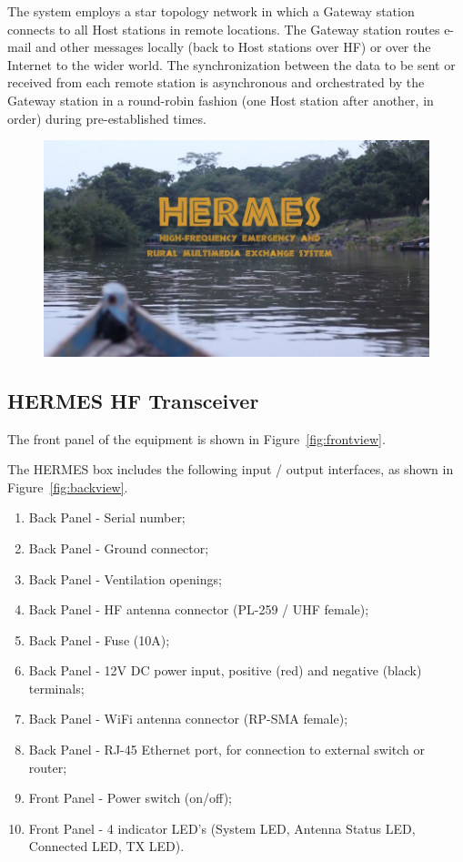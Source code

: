 \documentclass[11pt,a4paper]{article}
\begin{document}
The system employs a star topology network in which a Gateway station connects to all Host stations in remote locations. The Gateway station routes e-mail and other messages locally (back to Host stations over HF) or over the Internet to the wider world. The synchronization between the data to be sent or received from each remote station is asynchronous and orchestrated by the Gateway station in a round-robin fashion (one Host station after another, in order) during pre-established times.

\begin{figure}[!ht]
\includegraphics[width=1\textwidth]{pictures/hermes.png}
\end{figure}

\subsection{HERMES HF Transceiver}

The front panel of the equipment is shown in Figure~\ref{fig:frontview}.

The HERMES box includes the following input / output interfaces, as shown in Figure~\ref{fig:backview}.

\begin{enumerate}
    \item Back Panel - Serial number;
    \item Back Panel - Ground connector;
    \item Back Panel - Ventilation openings;
    \item Back Panel - HF antenna connector (PL-259 / UHF female);
     \item Back Panel - Fuse (10A);
    \item Back Panel - 12V DC power input, positive (red) and negative (black) terminals;
    \item Back Panel - WiFi antenna connector (RP-SMA female);
    \item Back Panel - RJ-45 Ethernet port, for connection to external switch or router;
    \item Front Panel - Power switch (on/off);
    \item Front Panel - 4 indicator LED's (System LED, Antenna Status LED, Connected LED, TX LED).
\end{enumerate}
\end{document}
